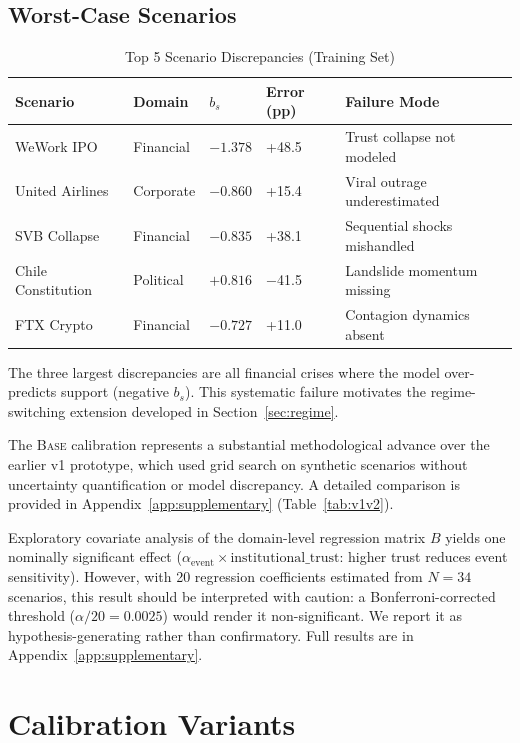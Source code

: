 \documentclass[12pt]{article}
\begin{document}
\subsection{Worst-Case Scenarios}

\begin{table}[H]
\centering
\caption{Top 5 Scenario Discrepancies (Training Set)}
\label{tab:worst_case}
\begin{tabular}{lllll}
\toprule
Scenario & Domain & $b_s$ & Error (pp) & Failure Mode \\
\midrule
WeWork IPO & Financial & $-1.378$ & +48.5 & Trust collapse not modeled \\
United Airlines & Corporate & $-0.860$ & +15.4 & Viral outrage underestimated \\
SVB Collapse & Financial & $-0.835$ & +38.1 & Sequential shocks mishandled \\
Chile Constitution & Political & $+0.816$ & $-$41.5 & Landslide momentum missing \\
FTX Crypto & Financial & $-0.727$ & +11.0 & Contagion dynamics absent \\
\bottomrule
\end{tabular}
\end{table}

The three largest discrepancies are all financial crises where the model over-predicts support (negative $b_s$). This systematic failure motivates the regime-switching extension developed in Section~\ref{sec:regime}.

The \textsc{Base} calibration represents a substantial methodological advance over the earlier v1 prototype, which used grid search on synthetic scenarios without uncertainty quantification or model discrepancy. A detailed comparison is provided in Appendix~\ref{app:supplementary} (Table~\ref{tab:v1v2}).

Exploratory covariate analysis of the domain-level regression matrix $B$ yields one nominally significant effect ($\alpha_{\text{event}} \times \text{institutional\_trust}$: higher trust reduces event sensitivity). However, with 20 regression coefficients estimated from $N=34$ scenarios, this result should be interpreted with caution: a Bonferroni-corrected threshold ($\alpha/20 = 0.0025$) would render it non-significant. We report it as hypothesis-generating rather than confirmatory. Full results are in Appendix~\ref{app:supplementary}.

\section{Calibration Variants}
\label{sec:evolution}
\end{document}
